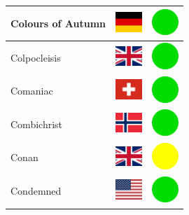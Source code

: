 \documentclass[12pt, a4paper, twoside]{report}
\begin{document}
\begin{center}
\begin{longtable}{|p{5cm}|p{2cm}|p{2cm}|}
 Colours of Autumn                                          & \includegraphics[width=1cm]{4x3/de} &   \includegraphics[width=1cm]{likes/y} \\ \hline
 Colpocleisis                                               & \includegraphics[width=1cm]{4x3/gb} &   \includegraphics[width=1cm]{likes/y} \\ \hline
 Comaniac                                                   & \includegraphics[width=1cm]{4x3/ch} &   \includegraphics[width=1cm]{likes/y} \\ \hline
 Combichrist                                                & \includegraphics[width=1cm]{4x3/no} &   \includegraphics[width=1cm]{likes/y} \\ \hline
 Conan                                                      & \includegraphics[width=1cm]{4x3/gb} &   \includegraphics[width=1cm]{likes/m} \\ \hline
 Condemned                                                  & \includegraphics[width=1cm]{4x3/us} &   \includegraphics[width=1cm]{likes/y} \\ \hline

\end{longtable}
\end{center}
\end{document}
